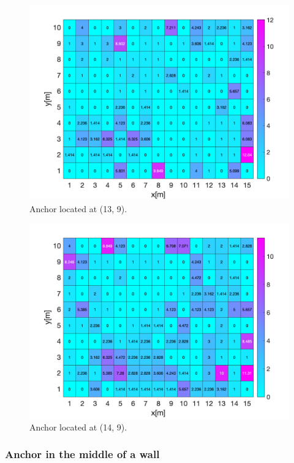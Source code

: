 \begin{figure}[H]
\centering
\includegraphics[width=.9\linewidth]{Images/Anchor_at_(13_9).png}
\caption{Anchor located at (13, 9).}
\end{figure}

\begin{figure}[H]
\centering
\includegraphics[width=.9\linewidth]{Images/Anchor_at_(14_9).png}
\caption{Anchor located at (14, 9).}
\end{figure}

\subsubsection*{Anchor in the middle of a wall}

